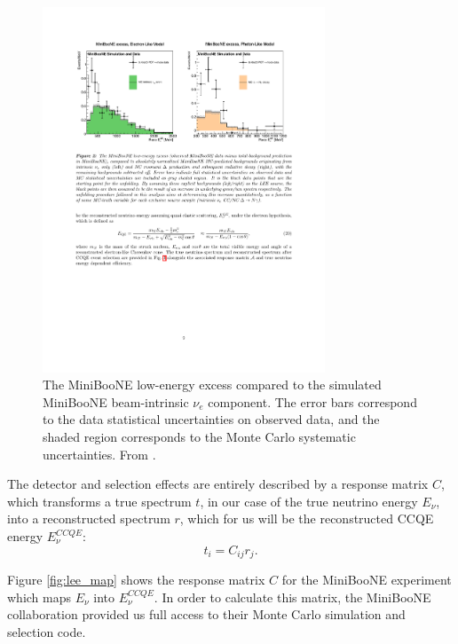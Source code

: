 \begin{figure}[htbp]
\centering
\includegraphics[width=0.75\textwidth]{figures/lee_excess.pdf} 
\caption{The MiniBooNE low-energy excess compared to the simulated MiniBooNE beam-intrinsic $\nu_e$ component. The error bars correspond to the data statistical uncertainties on observed data, and the shaded region corresponds to the Monte Carlo systematic uncertainties. From \cite{lee_unfolding}.} 
\label{fig:excess}
\end{figure}

The detector and selection effects are entirely described by a response matrix $C$, which transforms a true spectrum $t$, in our case of the true neutrino energy $E_{\nu}$, into a reconstructed spectrum $r$, which for us will be the reconstructed CCQE energy $E_{\nu}^{CCQE}$:
\begin{equation}
    t_i = C_{ij} r_j.
\end{equation}

Figure \ref{fig:lee_map} shows the response matrix $C$ for the MiniBooNE experiment which maps $E_{\nu}$ into $E_{\nu}^{CCQE}$. In order to calculate this matrix, the MiniBooNE collaboration provided us full access to their Monte Carlo simulation and selection code.


